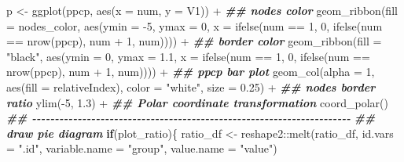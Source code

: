 \documentclass[
]{article}
\newenvironment{Shaded}{\begin{snugshade}}{\end{snugshade}}
\newcommand{\AttributeTok}[1]{\textcolor[rgb]{0.77,0.63,0.00}{#1}}
\newcommand{\ControlFlowTok}[1]{\textcolor[rgb]{0.13,0.29,0.53}{\textbf{#1}}}
\newcommand{\DecValTok}[1]{\textcolor[rgb]{0.00,0.00,0.81}{#1}}
\newcommand{\DocumentationTok}[1]{\textcolor[rgb]{0.56,0.35,0.01}{\textbf{\textit{#1}}}}
\newcommand{\FloatTok}[1]{\textcolor[rgb]{0.00,0.00,0.81}{#1}}
\newcommand{\FunctionTok}[1]{\textcolor[rgb]{0.00,0.00,0.00}{#1}}
\newcommand{\NormalTok}[1]{#1}
\newcommand{\OtherTok}[1]{\textcolor[rgb]{0.56,0.35,0.01}{#1}}
\newcommand{\SpecialCharTok}[1]{\textcolor[rgb]{0.00,0.00,0.00}{#1}}
\newcommand{\StringTok}[1]{\textcolor[rgb]{0.31,0.60,0.02}{#1}}
\begin{document}
\begin{Shaded}
\begin{Highlighting}[]
\NormalTok{    p }\OtherTok{\textless{}{-}} \FunctionTok{ggplot}\NormalTok{(ppcp, }\FunctionTok{aes}\NormalTok{(}\AttributeTok{x =}\NormalTok{ num, }\AttributeTok{y =}\NormalTok{ V1)) }\SpecialCharTok{+}
      \DocumentationTok{\#\# nodes color}
      \FunctionTok{geom\_ribbon}\NormalTok{(}\AttributeTok{fill =}\NormalTok{ nodes\_color,}
                           \FunctionTok{aes}\NormalTok{(}\AttributeTok{ymin =} \SpecialCharTok{{-}}\DecValTok{5}\NormalTok{, }\AttributeTok{ymax =} \DecValTok{0}\NormalTok{,}
                               \AttributeTok{x =} \FunctionTok{ifelse}\NormalTok{(num }\SpecialCharTok{==} \DecValTok{1}\NormalTok{, }\DecValTok{0}\NormalTok{,}
                                          \FunctionTok{ifelse}\NormalTok{(num }\SpecialCharTok{==} \FunctionTok{nrow}\NormalTok{(ppcp), num }\SpecialCharTok{+} \DecValTok{1}\NormalTok{, num)))) }\SpecialCharTok{+}
      \DocumentationTok{\#\# border color}
      \FunctionTok{geom\_ribbon}\NormalTok{(}\AttributeTok{fill =} \StringTok{"black"}\NormalTok{,}
                           \FunctionTok{aes}\NormalTok{(}\AttributeTok{ymin =} \DecValTok{0}\NormalTok{, }\AttributeTok{ymax =} \FloatTok{1.1}\NormalTok{,}
                               \AttributeTok{x =} \FunctionTok{ifelse}\NormalTok{(num }\SpecialCharTok{==} \DecValTok{1}\NormalTok{, }\DecValTok{0}\NormalTok{,}
                                          \FunctionTok{ifelse}\NormalTok{(num }\SpecialCharTok{==} \FunctionTok{nrow}\NormalTok{(ppcp), num }\SpecialCharTok{+} \DecValTok{1}\NormalTok{, num)))) }\SpecialCharTok{+}
        \DocumentationTok{\#\# ppcp bar plot}
        \FunctionTok{geom\_col}\NormalTok{(}\AttributeTok{alpha =} \DecValTok{1}\NormalTok{, }\FunctionTok{aes}\NormalTok{(}\AttributeTok{fill =}\NormalTok{ relativeIndex), }\AttributeTok{color =} \StringTok{"white"}\NormalTok{, }\AttributeTok{size =} \FloatTok{0.25}\NormalTok{) }\SpecialCharTok{+}
        \DocumentationTok{\#\# nodes border ratio}
        \FunctionTok{ylim}\NormalTok{(}\SpecialCharTok{{-}}\DecValTok{5}\NormalTok{, }\FloatTok{1.3}\NormalTok{) }\SpecialCharTok{+}
        \DocumentationTok{\#\# Polar coordinate transformation}
        \FunctionTok{coord\_polar}\NormalTok{()}
    \DocumentationTok{\#\# {-}{-}{-}{-}{-}{-}{-}{-}{-}{-}{-}{-}{-}{-}{-}{-}{-}{-}{-}{-}{-}{-}{-}{-}{-}{-}{-}{-}{-}{-}{-}{-}{-}{-}{-}{-}{-}{-}{-}{-}{-}{-}{-}{-}{-}{-}{-}{-}{-}{-}{-}{-}{-}{-}{-}{-}{-}{-}{-}{-}{-}{-}{-}{-}{-}{-}{-}{-}{-}{-} }
    \DocumentationTok{\#\# draw pie diagram}
    \ControlFlowTok{if}\NormalTok{(plot\_ratio)\{}
\NormalTok{      ratio\_df }\OtherTok{\textless{}{-}}\NormalTok{ reshape2}\SpecialCharTok{::}\FunctionTok{melt}\NormalTok{(ratio\_df, }\AttributeTok{id.vars =} \StringTok{".id"}\NormalTok{, }\AttributeTok{variable.name =} \StringTok{"group"}\NormalTok{, }\AttributeTok{value.name =} \StringTok{"value"}\NormalTok{)}

\end{Highlighting}
\end{Shaded}
\end{document}
